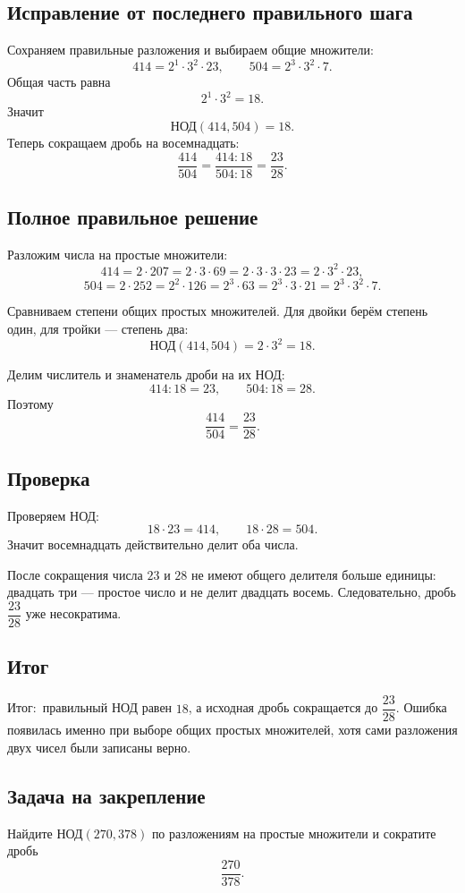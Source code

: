 \documentclass[12pt,a4paper]{article}
\newcommand{\Outcome}{\textcolor{teal!60!black}{Итог:}}
\begin{document}
\subsection*{Исправление от последнего правильного шага}
Сохраняем правильные разложения и выбираем общие множители:
\[
414=2^1\cdot3^2\cdot23,
\qquad
504=2^3\cdot3^2\cdot7.
\]
Общая часть равна
\[
2^1\cdot3^2=18.
\]
Значит
\[
\text{НОД}(414,504)=18.
\]
Теперь сокращаем дробь на восемнадцать:
\[
\frac{414}{504}
=\frac{414:18}{504:18}
=\frac{23}{28}.
\]

\subsection*{Полное правильное решение}
Разложим числа на простые множители:
\[
414=2\cdot207=2\cdot3\cdot69=2\cdot3\cdot3\cdot23
=2\cdot3^2\cdot23,
\]
\[
504=2\cdot252
=2^2\cdot126
=2^3\cdot63
=2^3\cdot3\cdot21
=2^3\cdot3^2\cdot7.
\]

Сравниваем степени общих простых множителей. Для двойки берём степень один, для тройки --- степень два:
\[
\text{НОД}(414,504)=2\cdot3^2=18.
\]

Делим числитель и знаменатель дроби на их НОД:
\[
414:18=23,
\qquad
504:18=28.
\]
Поэтому
\[
\frac{414}{504}=\frac{23}{28}.
\]

\subsection*{Проверка}
Проверяем НОД:
\[
18\cdot23=414,
\qquad
18\cdot28=504.
\]
Значит восемнадцать действительно делит оба числа.

После сокращения числа $23$ и $28$ не имеют общего делителя больше единицы: двадцать три --- простое число и не делит двадцать восемь. Следовательно, дробь $\dfrac{23}{28}$ уже несократима.

\subsection*{Итог}
\Outcome\ правильный НОД равен $18$, а исходная дробь сокращается до $\dfrac{23}{28}$. Ошибка появилась именно при выборе общих простых множителей, хотя сами разложения двух чисел были записаны верно.

\subsection*{Задача на закрепление}
Найдите $\text{НОД}(270,378)$ по разложениям на простые множители и сократите дробь
\[
\frac{270}{378}.
\]
\end{document}
